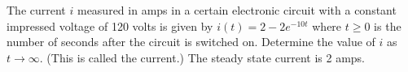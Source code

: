{\label{explogsappcircuitone} The current $i$ measured in amps in a certain electronic circuit with a constant impressed voltage of 120 volts is given by $i(t) = 2 - 2e^{-10t}$ where $t \geq 0$ is the number of seconds after the circuit is switched on.  Determine the value of $i$ as $t \rightarrow \infty$.  (This is called the  current.)}
{ The steady state current is 2 amps.}